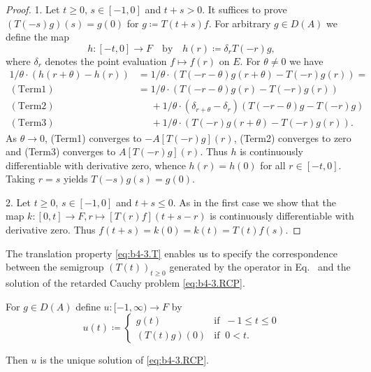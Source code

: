 \begin{proof}
1. Let $t \geq 0$, $s \in [-1,0]$ and $t+s  >  0$.
It suffices to prove $(T(-s)g)(s) = g(0)$ for $g  \coloneq  T(t+s)f$.
For arbitrary $g \in D(A)$ we define the map
\[
h \colon [-t,0] \to F \quad \text{by} \quad h(r) \coloneq  \delta_{r}T(-r)g ,
\]
where $\delta_{r}$ denotes the point evaluation $f \mapsto f(r)$ on $E$.
For $\theta \neq 0$ we have
\begin{align*}
	1/\theta\cdot(h(r+\theta) - h(r)) & = 1/\theta\cdot(T(-r-\theta)g(r+\theta) - T(-r)g(r)) =\\
	(\mathrm{Term1})\quad  &= 1/\theta\cdot(T(-r-\theta)g(r) - T(-r)g(r)) \\
	(\mathrm{Term2})\quad  &\phantom{= }  + 1/\theta\cdot(\delta_{r+\theta} - \delta_{r})(T(-r-\theta)g - T(-r)g) \\
	(\mathrm{Term3})\quad &\phantom{= }  + 1/\theta\cdot(T(-r)g(r+\theta) - T(-r)g(r)).
\end{align*}
As $\theta \to 0$, (Term1) converges to $-A[T(-r)g](r)$, (Term2) converges to zero and (Term3) converges to $A[T(-r)g](r)$.
Thus $h$ is continuously differentiable with derivative zero, whence $h(r) = h(0)$ for all $r \in [-t,0]$.
Taking $r = s$ yields $T(-s)g(s) = g(0)$.

2. Let $t \geq 0$, $s \in [-1,0]$ and $t+s \leq 0$.
As in the first case we show that the map $k \colon [0,t] \to F , r \mapsto [T(r)f](t+s-r)$ is continuously differentiable with derivative zero.
Thus $f(t+s) = k(0) = k(t) = T(t)f(s)$.
\end{proof}
The translation property \eqref{eq:b4-3.T} enables us to specify the correspondence between the semigroup $(T(t))_{t\geq 0}$ generated by the operator in Eq.~ and the solution of the retarded Cauchy problem \eqref{eq:b4-3.RCP}.
\begin{corollary}\label{cor:b4-3.2}
	For $g \in D(A)$ define $u \colon [-1,\infty) \to F$ by
	\[u(t)  \coloneq  \begin{cases}
		g(t) & \text{if } \ -1 \leq t \leq 0 \\
		(T(t)g)(0) & \text{if } \ 0 < t.
	\end{cases}\]
	
	Then $u$ is the unique solution of \eqref{eq:b4-3.RCP}.
\end{corollary}
